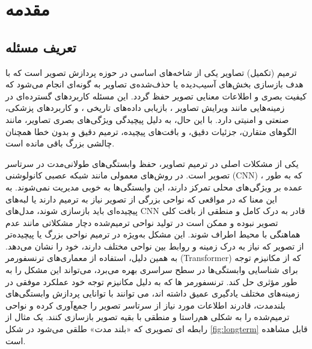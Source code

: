 \chapter{مقدمه}
\section{تعریف مسئله}

ترمیم (تکمیل) تصاویر 
یکی از شاخه‌های اساسی در حوزه پردازش تصویر است که با هدف بازسازی بخش‌های آسیب‌دیده یا حذف‌شده‌ی تصاویر به گونه‌ای انجام می‌شود که کیفیت بصری و اطلاعات معنایی تصویر حفظ گردد. این مسئله کاربردهای گسترده‌ای در زمینه‌هایی مانند ویرایش تصاویر 
\cite{joSCFEGANFaceEditing2019}
، بازیابی داده‌های تاریخی %
\cite{wanBringingOldPhotos2020, wanOldPhotoRestoration2020}%
، و کاربردهای پزشکی، صنعتی و امنیتی دارد. با این حال، به دلیل پیچیدگی ویژگی‌های بصری تصاویر، مانند الگوهای متقارن، جزئیات دقیق، و بافت‌های پیچیده، ترمیم دقیق و بدون خطا همچنان چالشی بزرگ باقی مانده است.

یکی از مشکلات اصلی در ترمیم تصاویر، حفظ وابستگی‌های طولانی‌مدت در سرتاسر تصویر است. در روش‌های معمولی مانند شبکه عصبی کانولوشنی (CNN)
\cite{laubeImageInpaintingHighResolution2018}%
، که به طور عمده بر ویژگی‌های محلی تمرکز دارند، این وابستگی‌ها به خوبی مدیریت نمی‌شوند. به این معنا که در مواقعی که نواحی بزرگی از تصویر نیاز به ترمیم دارند یا لبه‌های پیچیده‌ای باید بازسازی شوند، مدل‌های CNN قادر به درک کامل و منطقی از بافت کلی تصویر نبوده و ممکن است در تولید نواحی ترمیم‌شده دچار مشکلاتی مانند عدم هماهنگی با محیط اطراف شوند. این مشکل به‌ویژه در ترمیم نواحی بزرگ یا پیچیده‌تر از تصویر که نیاز به درک زمینه و روابط بین نواحی مختلف دارند، خود را نشان می‌دهد. به همین دلیل، استفاده از معماری‌های ترنسفورمر (Transformer)
\cite{vaswaniAttentionAllYou2023}
که از مکانیزم توجه
\cite{bahdanauNeuralMachineTranslation2016}
 برای شناسایی وابستگی‌ها در سطح سراسری بهره می‌برد، می‌تواند این مشکل را به طور مؤثری حل کند. ترنسفورمر ها  که به دلیل مکانیزم توجه خود عملکرد موفقی در زمینه‌های مختلف یادگیری عمیق داشته اند، می توانند با توانایی پردازش وابستگی‌های بلندمدت، قادرند اطلاعات مورد نیاز از سرتاسر تصویر را جمع‌آوری کرده و نواحی ترمیم‌شده را به شکلی هم‌راستا و منطقی با بقیه تصویر بازسازی کنند. یک مثال از رابطه ای تصویری که «بلند مدت‌» طلقی می‌شود در شکل \ref{fig:longterm} قابل مشاهده است.
 
